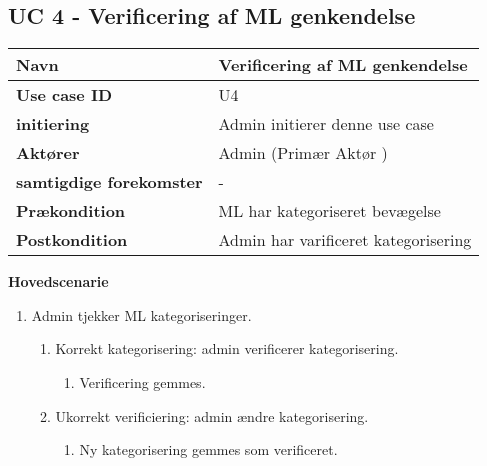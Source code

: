 \subsection{UC 4 - Verificering af ML genkendelse}
\begin{table}[htbp] 
	\begin{tabular}{|p{5cm}|p{9cm}|}
		\hline
		\textbf{Navn} & Verificering af ML genkendelse \\ \hline
		\textbf{Use case ID} & U4 \\ \hline
		\textbf{initiering} & Admin initierer denne use case \\ \hline
		\textbf{Aktører} & Admin (Primær Aktør ) \\ \hline
		\textbf{samtigdige forekomster} & - \\ \hline
		\textbf{Prækondition} & ML har kategoriseret bevægelse \\ \hline
		\textbf{Postkondition} & Admin har varificeret kategorisering  \\ \hline
	\end{tabular}
\end{table}
\textbf{Hovedscenarie}
\begin{enumerate}
	\item Admin tjekker ML kategoriseringer.
	\begin{enumerate}
		\item Korrekt kategorisering: admin verificerer kategorisering.
		\begin{enumerate}
			\item Verificering gemmes.
		\end{enumerate}
		\item Ukorrekt verificiering: admin ændre kategorisering.
		\begin{enumerate}
			\item Ny kategorisering gemmes som verificeret.
		\end{enumerate}
	\end{enumerate}
\end{enumerate}
\clearpage
